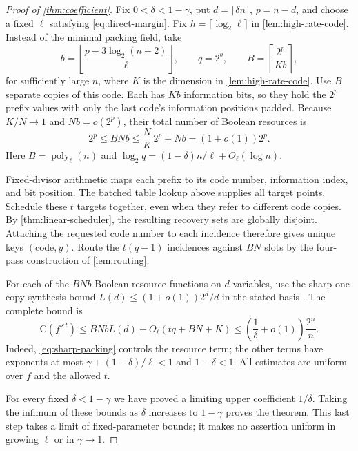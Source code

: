 \documentclass[11pt]{article}
\newcommand{\C}{\mathrm{C}}
\newcommand{\poly}{\operatorname{poly}}
\begin{document}
\begin{proof}[Proof of \cref{thm:coefficient}]
Fix $0<\delta<1-\gamma$, put $d=\lceil\delta n\rceil$, $p=n-d$, and choose
a fixed $\ell$ satisfying \eqref{eq:direct-margin}.  Fix
$h=\lceil\log_2\ell\rceil$ in \cref{lem:high-rate-code}.  Instead of the
minimal packing field, take
\[
  b=\left\lfloor\frac{p-3\log_2(n+2)}{\ell}\right\rfloor,
  \qquad q=2^b,
  \qquad B=\left\lceil\frac{2^p}{Kb}\right\rceil,
\]
for sufficiently large $n$, where $K$ is the dimension in
\cref{lem:high-rate-code}.  Use $B$ separate copies of this code.  Each has
$Kb$ information bits, so they hold the $2^p$ prefix values with only the
last code's information positions padded.  Because $K/N\to1$ and
$Nb=o(2^p)$, their total number of Boolean resources is
\begin{equation}\label{eq:sharp-packing}
  2^p\le BNb
       \le\frac NK\,2^p+Nb=(1+o(1))2^p.
\end{equation}
Here $B=\poly_\ell(n)$ and
$\log_2q=(1-\delta)n/\ell+O_\ell(\log n)$.

Fixed-divisor arithmetic maps each prefix to its code number, information
index, and bit position.  The batched table lookup above supplies all target
points.  Schedule these $t$ targets together, even when they refer to different
code copies.  By \cref{thm:linear-scheduler}, the resulting recovery sets are
globally disjoint.  Attaching the requested code number to each incidence
therefore gives unique keys $(\text{code},y)$.  Route the $t(q-1)$ incidences
against $BN$ slots by the four-pass construction of \cref{lem:routing}.

For each of the $BNb$ Boolean resource functions on $d$ variables, use the
sharp one-copy synthesis bound
$L(d)\le(1+o(1))2^d/d$ in the stated basis
\cite{FrandsenMiltersen2005}.  The complete bound is
\[
  \C(f^{\times t})
  \le BNbL(d)+\widetilde O_\ell(tq+BN+K)
  \le\left(\frac1\delta+o(1)\right)\frac{2^n}{n}.
\]
Indeed, \eqref{eq:sharp-packing} controls the resource term; the other terms
have exponents at most $\gamma+(1-\delta)/\ell<1$ and $1-\delta<1$.
All estimates are uniform over $f$ and the allowed $t$.

For every fixed $\delta<1-\gamma$ we have proved a limiting upper coefficient
$1/\delta$.  Taking the infimum of these bounds as $\delta$ increases to
$1-\gamma$ proves the theorem.  This last step takes a limit of fixed-parameter
bounds; it makes no assertion uniform in growing $\ell$ or in $\gamma\to1$.
\end{proof}
\end{document}
